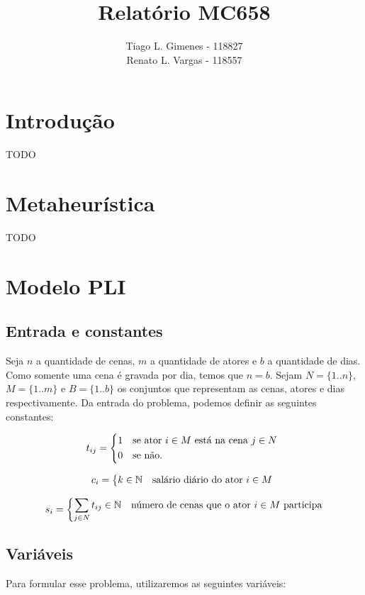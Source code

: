 \documentclass[a4paper,11pt]{article}
\title{Relatório MC658}
\author{Tiago L. Gimenes - 118827\\
        Renato L. Vargas - 118557}
\begin{document}
\maketitle

\section{Introdução}
TODO

\section{Metaheurística}
TODO

\section{Modelo PLI}
\subsection{Entrada e constantes}
Seja $n$ a quantidade de cenas, $m$ a quantidade de atores e $b$ a quantidade de
dias. Como somente uma cena é gravada por dia, temos que $n = b$. Sejam $N=\{1..n\}$,
$M = \{1..m\}$ e $B=\{1..b\}$ os conjuntos que representam as cenas, atores e dias
respectivamente. Da entrada do problema, podemos definir as seguintes constantes:

\begin{equation}
  t_{ij} = \begin{dcases*}
              1 & se ator $i \in M$ está na cena $j \in N$ \\
              0 & se não.
           \end{dcases*}
  \label{tij}
\end{equation}

\begin{equation}
  c_{i} = \begin{dcases*} k \in \mathbb{N} & salário diário do ator $i \in M$ \end{dcases*}
\end{equation}

\begin{equation}
  s_{i} = \begin{dcases*} \sum_{j \in N} t_{ij} \in \mathbb{N} & número de cenas que o ator $i \in M$ participa\end{dcases*}
\end{equation}

\subsection{Variáveis}
Para formular esse problema, utilizaremos as seguintes variáveis:
\end{document}
